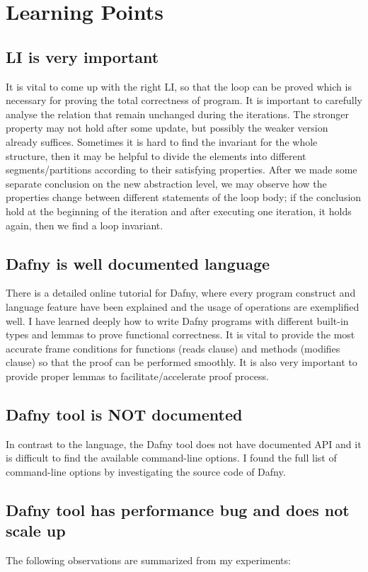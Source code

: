 \section*{Learning Points}
\subsection*{LI is very important}
It is vital to come up with the right LI, so that the loop can be proved which is necessary for proving the total correctness of program. It is important to carefully analyse the relation that remain unchanged during the iterations. The stronger property may not hold after some update, but possibly the weaker version already suffices. Sometimes it is hard to find the invariant for the whole structure, then it may be helpful to divide the elements into different segments/partitions according to their satisfying properties. After we made some separate conclusion on the new abstraction level, we may observe how the properties change between different statements of the loop body; if the conclusion hold at the beginning of the iteration and after executing one iteration, it holds again, then we find a loop invariant. 

\subsection*{Dafny is well documented language}
There is a detailed online tutorial for Dafny, where every program construct and language feature have been explained and the usage of operations are exemplified well. I have learned deeply how to write Dafny programs with different built-in types and lemmas to prove functional correctness. It is vital to provide the most accurate frame conditions for functions (reads clause) and methods (modifies clause) so that the proof can be performed smoothly. It is also very important to provide proper lemmas to facilitate/accelerate proof process. 

\subsection*{Dafny tool is NOT documented}
In contrast to the language, the Dafny tool does not have documented API and it is difficult to find the available command-line options. I found the full list of command-line options by investigating the source code of Dafny.


\subsection*{Dafny tool has performance bug and does not scale up}
The following observations are summarized from my experiments:\\


